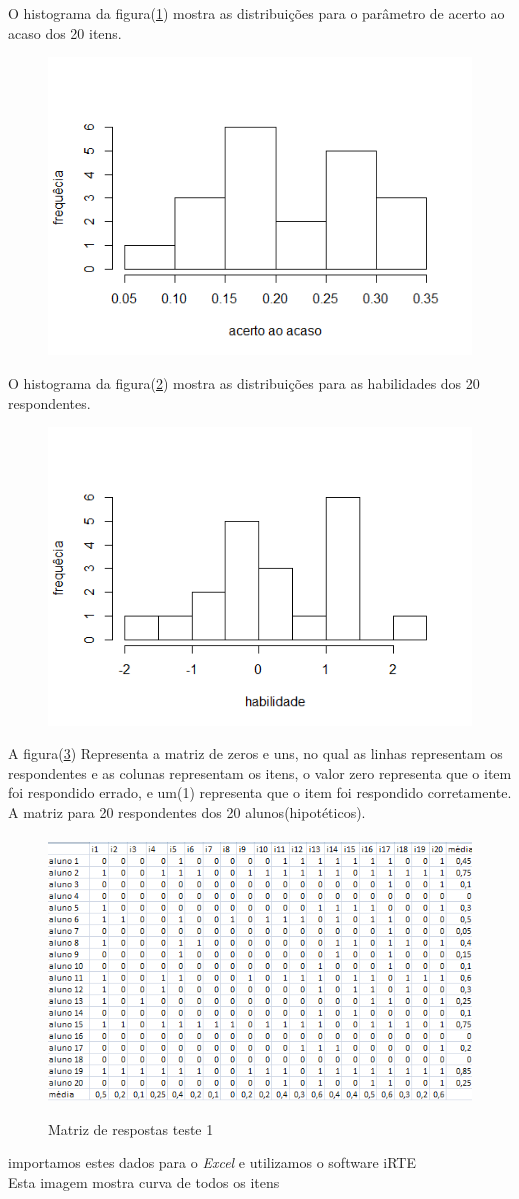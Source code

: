 	O histograma da figura(\ref{fig:c})  mostra as distribuições para o parâmetro de acerto ao acaso dos 20 itens.
	\begin{figure}[!h]
		\centering
		\includegraphics[width=0.6\linewidth]{img/c}
		\caption{}
		\label{fig:c}
	\end{figure}
	\newpage
	O histograma da figura(\ref{fig:hab}) mostra as distribuições para as habilidades dos 20 respondentes.
	\begin{figure} [!h]
		\centering
		\includegraphics[width=0.6\linewidth]{img/hab}
		\caption{}
		\label{fig:hab}
	\end{figure}
	    A figura(\ref{fig:zeros}) Representa a matriz de zeros e uns, no qual as linhas representam os respondentes e as colunas representam os itens, o valor zero representa que o item foi respondido errado, e um(1) representa que o item foi respondido corretamente. A matriz para 20 respondentes dos 20 alunos(hipotéticos).
    \paragraph{}
		\begin{figure}[!h]
		\caption{Matriz de respostas teste 1}
		\centering
		\includegraphics[width=0.6\linewidth]{img/zeros}
		\label{fig:zeros}
	\end{figure}
    importamos estes dados para o \textit{Excel} e utilizamos o software iRTE\\
	Esta imagem mostra curva de todos os itens\\
